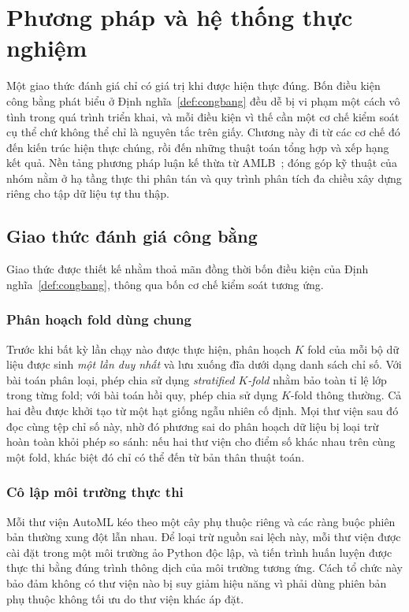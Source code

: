 \chapter{Phương pháp và hệ thống thực nghiệm}
\label{ch:phuongphap}

Một giao thức đánh giá chỉ có giá trị khi được hiện thực đúng. Bốn điều kiện công
bằng phát biểu ở Định nghĩa~\ref{def:congbang} đều dễ bị vi phạm một cách vô tình
trong quá trình triển khai, và mỗi điều kiện vì thế cần một cơ chế kiểm soát cụ
thể chứ không thể chỉ là nguyên tắc trên giấy. Chương này đi từ các cơ chế đó đến
kiến trúc hiện thực chúng, rồi đến những thuật toán tổng hợp và xếp hạng kết quả.
Nền tảng phương pháp luận kế thừa từ AMLB~\cite{gijsbers2024amlb}; đóng góp kỹ
thuật của nhóm nằm ở hạ tầng thực thi phân tán và quy trình phân tích đa chiều xây
dựng riêng cho tập dữ liệu tự thu thập.

\section{Giao thức đánh giá công bằng}
\label{sec:giaothuc}
Giao thức được thiết kế nhằm thoả mãn đồng thời bốn điều kiện của
Định nghĩa~\ref{def:congbang}, thông qua bốn cơ chế kiểm soát tương ứng.

\subsection{Phân hoạch fold dùng chung}
Trước khi bất kỳ lần chạy nào được thực hiện, phân hoạch $K$ fold của mỗi bộ dữ
liệu được sinh \emph{một lần duy nhất} và lưu xuống đĩa dưới dạng danh sách chỉ
số. Với bài toán phân loại, phép chia sử dụng \textit{stratified $K$-fold} nhằm
bảo toàn tỉ lệ lớp trong từng fold; với bài toán hồi quy, phép chia sử dụng
$K$-fold thông thường. Cả hai đều được khởi tạo từ một hạt giống ngẫu nhiên cố
định. Mọi thư viện sau đó đọc cùng tệp chỉ số này, nhờ đó phương sai do phân hoạch
dữ liệu bị loại trừ hoàn toàn khỏi phép so sánh: nếu hai thư viện cho điểm số khác
nhau trên cùng một fold, khác biệt đó chỉ có thể đến từ bản thân thuật toán.

\subsection{Cô lập môi trường thực thi}
Mỗi thư viện AutoML kéo theo một cây phụ thuộc riêng và các ràng buộc phiên bản
thường xung đột lẫn nhau. Để loại trừ nguồn sai lệch này, mỗi thư viện được cài
đặt trong một môi trường ảo Python độc lập, và tiến trình huấn luyện được thực thi
bằng đúng trình thông dịch của môi trường tương ứng. Cách tổ chức này bảo đảm
không có thư viện nào bị suy giảm hiệu năng vì phải dùng phiên bản phụ thuộc
không tối ưu do thư viện khác áp đặt.


